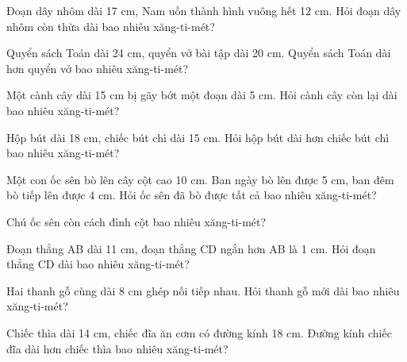\begin{ex}
Đoạn dây nhôm dài 17 cm, Nam uốn thành hình vuông hết 12 cm. Hỏi đoạn dây nhôm còn thừa dài bao nhiêu xăng-ti-mét?
\end{ex}

\begin{ex}
Quyển sách Toán dài 24 cm, quyển vở bài tập dài 20 cm. Quyển sách Toán dài hơn quyển vở bao nhiêu xăng-ti-mét?
\end{ex}

\begin{ex}
Một cành cây dài 15 cm bị gãy bớt một đoạn dài 5 cm. Hỏi cành cây còn lại dài bao nhiêu xăng-ti-mét?
\end{ex}

\begin{ex}
Hộp bút dài 18 cm, chiếc bút chì dài 15 cm. Hỏi hộp bút dài hơn chiếc bút chì bao nhiêu xăng-ti-mét?
\end{ex}

\begin{ex}
Một con ốc sên bò lên cây cột cao 10 cm. Ban ngày bò lên được 5 cm, ban đêm bò tiếp lên được 4 cm. Hỏi ốc sên đã bò được tất cả bao nhiêu xăng-ti-mét?
\end{ex}

\begin{ex}
Chú ốc sên còn cách đỉnh cột bao nhiêu xăng-ti-mét?
\end{ex}

\begin{ex}
Đoạn thẳng AB dài 11 cm, đoạn thẳng CD ngắn hơn AB là 1 cm. Hỏi đoạn thẳng CD dài bao nhiêu xăng-ti-mét?
\end{ex}

\begin{ex}
Hai thanh gỗ cùng dài 8 cm ghép nối tiếp nhau. Hỏi thanh gỗ mới dài bao nhiêu xăng-ti-mét?
\end{ex}

\begin{ex}
Chiếc thìa dài 14 cm, chiếc đĩa ăn cơm có đường kính 18 cm. Đường kính chiếc đĩa dài hơn chiếc thìa bao nhiêu xăng-ti-mét?
\end{ex}
